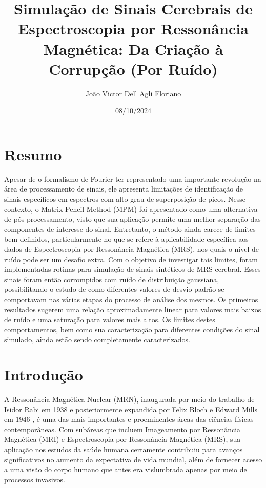 \documentclass[
12pt,		
twoside, 
a4paper,
chapter=TITLE,
english,			
brazil]{USPSC-classe/USPSC}
\title{ Simulação de Sinais Cerebrais de Espectroscopia por 
Ressonância Magnética: Da Criação à Corrupção (Por Ruído)}
\author{João Victor Dell Agli Floriano}
\date{08/10/2024}
\begin{document}
\frenchspacing 

\maketitle

\section{Resumo}
Apesar de o formalismo de Fourier ter representado uma importante revolução na área de processamento 
de sinais, ele apresenta limitações de identificação de sinais específicos em espectros com alto grau 
de superposição de picos. Nesse contexto, o Matrix Pencil Method (MPM) foi apresentado como uma 
alternativa de pós-processamento, visto que sua aplicação permite uma melhor separação das componentes 
de interesse do sinal.  Entretanto, o método ainda carece de limites bem definidos, particularmente no 
que se refere à aplicabilidade específica aos dados de Espectroscopia por Ressonância Magnética (MRS), 
nos quais o nível de ruído pode ser um desafio extra. Com o objetivo de investigar tais limites, foram 
implementadas rotinas para simulação de sinais sintéticos de MRS cerebral. Esses sinais foram então 
corrompidos com ruído de distribuição gaussiana, possibilitando o estudo de como diferentes valores de 
desvio padrão se comportavam nas várias etapas do processo de análise dos mesmos. Os primeiros resultados 
sugerem uma relação aproximadamente linear para valores mais baixos de ruído e uma saturação para valores 
mais altos. Os limites destes comportamentos, bem como sua caracterização para diferentes condições do sinal 
simulado, ainda estão sendo completamente caracterizados.
\section{Introdução}

A Ressonância Magnética Nuclear (MRN), inaugurada por meio do trabalho de Isidor Rabi em 1938 \cite{} e 
posteriormente expandida por Felix Bloch e Edward Mills em 1946 \cite{}, é uma das mais importantes e proeminentes áreas das
ciências físicas contemporâneas. Com subáreas que incluem Imageamento por Ressonância Magnética (MRI) e 
Espectroscopia por Ressonância Magnética (MRS), sua aplicação nos estudos da saúde humana certamente contribuiu para
avanços significativos no aumento da expectativa de vida mundial, além de fornecer acesso a uma visão do corpo humano que antes
era vislumbrada apenas por meio de processos invasivos.
\end{document}
